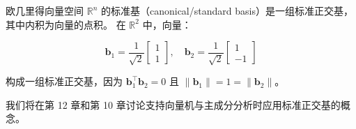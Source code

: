 \begin{notebox}
欧几里得向量空间 $ \mathbb{R}^n $ 的标准基（canonical/standard basis）是一组标准正交基，其中内积为向量的点积。 在 $ \mathbb{R}^2 $ 中，向量：

\begin{equation}
\boldsymbol{b}_1 = \frac{1}{\sqrt{2}} \begin{bmatrix} 1 \\ 1 \end{bmatrix}, \quad \boldsymbol{b}_2 = \frac{1}{\sqrt{2}} \begin{bmatrix} 1 \\ -1 \end{bmatrix}
\tag{3.35}\label{eq:3-35}
\end{equation}

构成一组标准正交基，因为 $ \boldsymbol{b}_1^\top \boldsymbol{b}_2 = 0 $ 且 $ \|\boldsymbol{b}_1\| = 1 = \|\boldsymbol{b}_2\| $。
\end{notebox}

我们将在第 12 章和第 10 章讨论支持向量机与主成分分析时应用标准正交基的概念。
